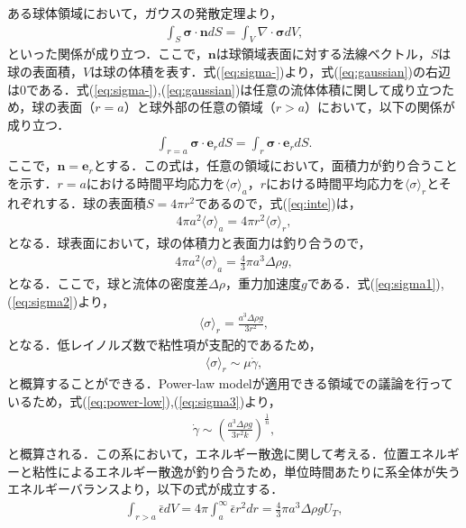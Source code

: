 ある球体領域において，ガウスの発散定理より，
\begin{eqnarray}
    \int_S{\bm{\sigma \cdot \bm{n}}}dS = \int_V{\nabla \cdot \bm{\sigma}}dV ,
    \label{eq:gaussian}
\end{eqnarray}
といった関係が成り立つ．ここで，$\bm{n}$は球領域表面に対する法線ベクトル，$S$は球の表面積，$V$は球の体積を表す．式(\ref{eq:sigma-})より，式(\ref{eq:gaussian})の右辺は0である．式(\ref{eq:sigma-}),(\ref{eq:gaussian})は任意の流体体積に関して成り立つため，球の表面（$r = a$）と球外部の任意の領域（$r > a$）において，以下の関係が成り立つ．
\begin{eqnarray}
    \int_{r=a}\bm{\sigma}\cdot\bm{e}_r dS=\int_r\bm{\sigma}\cdot\bm{e}_r dS .
    \label{eq:inte}
\end{eqnarray}
ここで，$\bm{n} = \bm{e}_r$とする．この式は，任意の領域において，面積力が釣り合うことを示す．$r = a$における時間平均応力を$\langle\sigma\rangle_a$，$r$における時間平均応力を$\langle\sigma\rangle_r$とそれぞれする．球の表面積$S=4\pi r^2$であるので，式(\ref{eq:inte})は，
\begin{eqnarray}
    4\pi a^2\langle\sigma\rangle_a = 4\pi r^2\langle\sigma\rangle_r ,
    \label{eq:sigma1}
\end{eqnarray}
となる．球表面において，球の体積力と表面力は釣り合うので，
\begin{eqnarray}
    4\pi a^2\langle\sigma\rangle_a = \frac{4}{3} \pi a^3 \Delta \rho g ,
    \label{eq:sigma2}
\end{eqnarray}
となる．ここで，球と流体の密度差$\Delta \rho$，重力加速度$g$である．式(\ref{eq:sigma1}),(\ref{eq:sigma2})より，
\begin{eqnarray}
    \langle\sigma\rangle_r = \frac{a^3\Delta\rho g}{3r^2} ,
\end{eqnarray}
となる．低レイノルズ数で粘性項が支配的であるため，
\begin{eqnarray}
    \langle\sigma\rangle_r \sim \mu \dot{\gamma} ,
    \label{eq:sigma3}
\end{eqnarray}
と概算することができる．Power-law modelが適用できる領域での議論を行っているため，式(\ref{eq:power-low}),(\ref{eq:sigma3})より，
\begin{eqnarray}
    \dot{\gamma} \sim \left(\frac{a^3\Delta\rho g}{3r^2 k}\right)^{\frac{1}{n}} ,
    \label{eq:gamma_abs}
\end{eqnarray}
と概算される．この系において，エネルギー散逸に関して考える．位置エネルギーと粘性によるエネルギー散逸が釣り合うため，単位時間あたりに系全体が失うエネルギーバランスより，以下の式が成立する．
\begin{eqnarray}
    \int_{r>a}\bar{\epsilon}dV = 4 \pi \int^\infty_a \bar{\epsilon}r^2 dr = \frac{4}{3}\pi a^3\Delta\rho g U_T ,
    \label{eq:eg}
\end{eqnarray}
